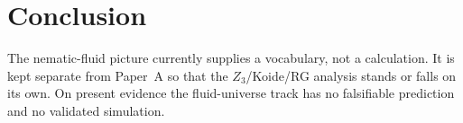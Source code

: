\documentclass[11pt]{article}
\begin{document}
\section{Conclusion}
\label{sec:conclusion}

The nematic-fluid picture currently supplies a vocabulary, not a calculation.
It is kept separate from Paper~A so that the $Z_3$/Koide/RG analysis stands or
falls on its own. On present evidence the fluid-universe track has no
falsifiable prediction and no validated simulation.
\end{document}
